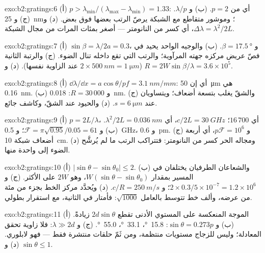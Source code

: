\begin{solution}{exo:b2:gratings:6}
(أ) $p > \lambda_{\min}/(\lambda_{\max} - \lambda_{\min}) = 1.33$: أي من $p = 2$. (ب) و $\lambda/p$. (ج)
و \qty{25}{nm}؛ وموشور متقاطع مع الشبكة يرصّ الرتب بعضها فوق
بعض. (د) و $\Delta\lambda = \lambda^2/2L$، أي كسر من النانومتر --- أصغر بمئات
المرات من مجال الشبكة.
\end{solution}

\begin{solution}{exo:b2:gratings:7}
(أ) $\sin\beta = \lambda/2a = 0.3$، و $\beta = \qty{17.5}{\degree}$. (ب) والوجيه الواحد يحيد
في فصّ عريض مركزه جهته المرآوية؛ والرتب التي
تقع داخله تنال الضوء. (ج) والرتبة الثانية ($2 \times \qty{500}{nm} = \qty{1}{\micro m}$ عند
الزاوية نفسها). (د) و $R = 2W\sin\beta/\lambda = 3.6 \times 10^5$.
\end{solution}

\begin{solution}{exo:b2:gratings:8}
(أ) $\dd\lambda/\dd x = a\cos\theta/pf = \qty{3.1}{nm/mm}$: أي إن \qty{50}{\micro m} هي \qty{0.16}{nm}. (ب)
و $R = 30\,000$: \qty{0.018}{nm}. (ج) والشقّ يغلب بتسعة أضعاف؛ ويتساويان عند $s = \qty{6}{\micro m}$.
(د) والحيود عند الشقّ، وكاشف جائع.
\end{solution}

\begin{solution}{exo:b2:gratings:9}
(أ) $p = 2L/\lambda$، أي $16\,700$؛  $c/2L = \qty{30}{GHz}$، أي $\lambda^2/2L = \qty{0.036}{nm}$. (ب) و $\mathcal F
= \pi\sqrt{0.95}/0.05 = 61$؛ و \qty{0.5}{GHz}، و \qty{0.6}{pm}. (ج) و $p\mathcal F = 10^6$، أي أربعة
أضعاف شبكة \qty{10}{cm}. (د) ومجاله الحر كسر من
النانومتر: فتتراكب الرتب ما لم يُرشَّح الضوء إلى واحدة منها.
\end{solution}

\begin{solution}{exo:b2:gratings:10}
(أ) $|\sin\theta - \sin\theta_0| \le 2$. (ب) والشعاعان الطرفيان يختلفان في المسير بمقدار
$W(\sin\theta - \sin\theta_0)$، وهو $2W$ على الأكثر. (ج) و $2 \times 0.3/5 \times 10^{-7} = 1.2 \times 10^6$؛ و $c/R
= \qty{250}{m/s}$. (د) ويُحدَّد مركز الخط بجزء من مئة من
عرضه، وألف خط تتوسط بالعامل $\sqrt{1000}$: فأمتار في
الثانية، مع استقرار بطولي.
\end{solution}

\begin{solution}{exo:b2:gratings:11}
(أ) الموجة المنعكسة على المستوي الأدنى تقطع $2d\sin\theta$ زيادةً.
(ب) و $\sin\theta = 0.273p$: \qty{15.8}{\degree}، \qty{33.1}{\degree}، \qty{55.0}{\degree}. (ج) و $\lambda \gg 2d$:
فلا زاوية تحقق المعادلة؛ وليس للزجاج مستويات منتظمة، ومن ثَمّ
حلقات منتشرة فقط --- فهو لابلوري. (د) و $\sin\theta \le 1$.
\end{solution}

